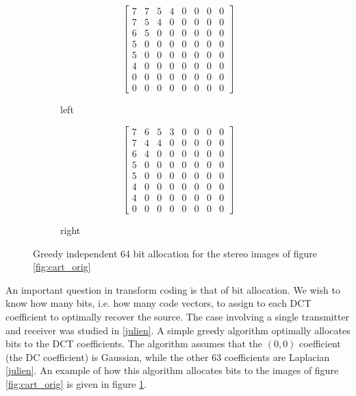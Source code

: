 \begin{figure}
    \begin{subfigure}{0.5\textwidth}
        \begin{equation*}
            \left[
            \begin{matrix}
                7 & 7 & 5 & 4 & 0 & 0 & 0 & 0 \\
                7 & 5 & 4 & 0 & 0 & 0 & 0 & 0 \\
                6 & 5 & 0 & 0 & 0 & 0 & 0 & 0 \\
                5 & 0 & 0 & 0 & 0 & 0 & 0 & 0 \\
                5 & 0 & 0 & 0 & 0 & 0 & 0 & 0 \\
                4 & 0 & 0 & 0 & 0 & 0 & 0 & 0 \\
                0 & 0 & 0 & 0 & 0 & 0 & 0 & 0 \\
                0 & 0 & 0 & 0 & 0 & 0 & 0 & 0
            \end{matrix}
            \right]
        \end{equation*}
    \caption{left}
    \end{subfigure}%
    \begin{subfigure}{0.5\textwidth}
        \begin{equation*}
            \left[
            \begin{matrix}
                7 & 6 & 5 & 3 & 0 & 0 & 0 & 0 \\
                7 & 4 & 4 & 0 & 0 & 0 & 0 & 0 \\
                6 & 4 & 0 & 0 & 0 & 0 & 0 & 0 \\
                5 & 0 & 0 & 0 & 0 & 0 & 0 & 0 \\
                5 & 0 & 0 & 0 & 0 & 0 & 0 & 0 \\
                4 & 0 & 0 & 0 & 0 & 0 & 0 & 0 \\
                4 & 0 & 0 & 0 & 0 & 0 & 0 & 0 \\
                0 & 0 & 0 & 0 & 0 & 0 & 0 & 0
            \end{matrix}
            \right]
        \end{equation*}
    \caption{right}
    \end{subfigure}
    \caption{Greedy independent 64 bit allocation for the stereo images of figure \ref{fig:cart_orig} }
    \label{fig:cart_bit_alloc}
\end{figure}

An important question in transform coding is that of bit allocation. We wish to know how many bits, i.e. how many code vectors, to assign to each DCT coefficient to optimally recover the source. The case involving a single transmitter and receiver was studied in \ref{julien}. A simple greedy algorithm optimally allocates bits to the DCT coefficients. The algorithm assumes that the $(0,0)$ coefficient (the DC coefficient) is Gaussian, while the other 63 coefficients are Laplacian \ref{julien}. An example of how this algorithm allocates bits to the images of figure \ref{fig:cart_orig} is given in figure \ref{fig:cart_bit_alloc}.


